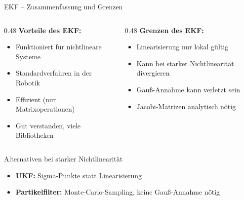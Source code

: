 \documentclass[%
  aspectratio=169,
  10pt
]{beamer}
\begin{document}
\begin{frame}{EKF -- Zusammenfassung und Grenzen}

\begin{columns}[T]
  \begin{column}{0.48\textwidth}
    \textbf{Vorteile des EKF:}
    \begin{itemize}\setlength{\itemsep}{0pt}\setlength{\parskip}{0pt}
      \item Funktioniert für nichtlineare Systeme
      \item Standardverfahren in der Robotik
      \item Effizient (nur Matrixoperationen)
      \item Gut verstanden, viele Bibliotheken
    \end{itemize}
  \end{column}
  \begin{column}{0.48\textwidth}
    \textbf{Grenzen des EKF:}
    \begin{itemize}\setlength{\itemsep}{0pt}\setlength{\parskip}{0pt}
      \item Linearisierung nur lokal gültig
      \item Kann bei starker Nichtlinearität divergieren
      \item Gauß-Annahme kann verletzt sein
      \item Jacobi-Matrizen analytisch nötig
    \end{itemize}
  \end{column}
\end{columns}

\vspace{1mm}
\begin{block}{Alternativen bei starker Nichtlinearität}
  \vspace{-2mm}
  \begin{itemize}\setlength{\itemsep}{0pt}
    \item \textbf{UKF:} Sigma-Punkte statt Linearisierung
    \item \textbf{Partikelfilter:} Monte-Carlo-Sampling, keine Gauß-Annahme nötig
  \end{itemize}
  \vspace{-2mm}
\end{block}

\end{frame}
\end{document}
